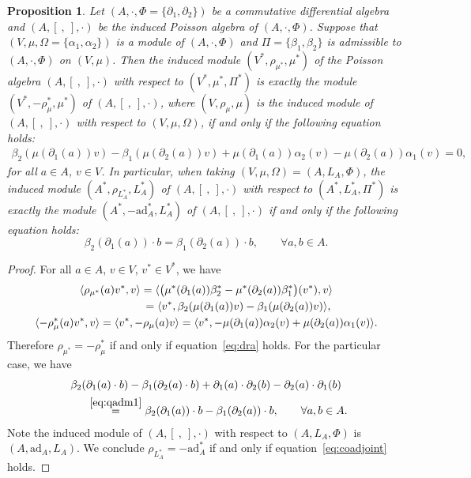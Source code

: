 \documentclass[pdftex]{sigma}
\numberwithin{equation}{section}
\newtheorem{Proposition}[Theorem]{Proposition}
{ \theoremstyle{definition}
	\newtheorem{Definition}[Theorem]{Definition}
	\newtheorem{Note}[Theorem]{Note}
	\newtheorem{Example}[Theorem]{Example}
	\newtheorem{Remark}[Theorem]{Remark} }
\newcommand{\ad}{\mathrm{ad}}
\begin{document}
\begin{Proposition}\label{pro:assdualrep}
 Let $(A, \cdot, \Phi = \{\partial_1, \partial_2\})$ be a commutative differential algebra and $(A, [\ ,\ ], \cdot)$ be the induced Poisson algebra of $(A, \cdot, \Phi)$.
 Suppose that $(V, \mu, \Omega = \{\alpha_1, \alpha_2\} )$ is a module of $(A, \cdot, \Phi)$ and
 $\Pi = \{\beta_1, \beta_2\}$ is admissible to $(A, \cdot, \Phi)$ on $(V, \mu)$.
 Then the induced module $(V^*, \rho_{\mu^*}, \mu^*)$ of the Poisson algebra $(A, [\ ,\ ], \cdot)$ with respect to $(V^*, \mu^*, \Pi^*)$ is exactly the module $(V^*, -\rho^*_\mu, \mu^*)$ of $(A, [\ ,\ ], \cdot)$,
 where $(V, \rho_\mu, \mu)$ is the induced module of $(A, [\ ,\ ], \cdot)$ with respect to $(V, \mu, \Omega)$,
 if and only if the following equation holds:
 \begin{gather}
 \beta_2(\mu(\partial_1(a))v) - \beta_1(\mu(\partial_2(a))v) + \mu(\partial_1(a))\alpha_2(v) - \mu(\partial_2(a))\alpha_1(v) = 0, \label{eq:dra}
 \end{gather}
for all $a \in A$, $v \in V$. In particular, when taking $(V, \mu, \Omega) = (A, L_A, \Phi)$,
 the induced module $(A^*, \rho_{L_A^*},\allowbreak L_A^*)$ of $(A, [\ ,\ ], \cdot)$ with respect to $(A^*, L_A^*, \Pi^*)$
 is exactly the module $(A^*, -\ad_A^*, L_A^*)$ of $(A, [\ ,\ ], \cdot)$
 if and only if the following equation holds:
 \begin{equation}
 \beta_2(\partial_1(a)) \cdot b = \beta_1(\partial_2(a)) \cdot b, \qquad \forall a, b \in A. \label{eq:coadjoint}
 \end{equation}
\end{Proposition}
\begin{proof}
 For all $a \in A$, $v \in V$, $v^* \in V^*$, we have
 \begin{gather*}
\langle \rho_{\mu^*}(a) v^*, v \rangle = \langle \big(\mu^*(\partial_1(a)) \beta_2^* - \mu^*(\partial_2(a)) \beta_1^*\big)(v^*), v \rangle \\
\hphantom{\langle \rho_{\mu^*}(a) v^*, v \rangle}{}
= \langle v^*, \beta_2(\mu(\partial_1(a))v) - \beta_1(\mu(\partial_2(a))v)\rangle, \\
\langle -\rho^*_{\mu}(a) v^*, v \rangle = \langle v^*, -\rho_{\mu}(a) v \rangle = \langle v^*, -\mu(\partial_1(a))\alpha_2(v) + \mu(\partial_2(a))\alpha_1(v) \rangle.
 \end{gather*}
 Therefore $\rho_{\mu^*} = -\rho^*_{\mu}$ if and only if equation~\eqref{eq:dra} holds.
 For the particular case, we have
 \begin{gather*}
 \beta_2(\partial_1(a) \cdot b) - \beta_1(\partial_2(a) \cdot b) + \partial_1(a) \cdot \partial_2(b) - \partial_2(a) \cdot \partial_1(b)\\
 \qquad{} \overset{\eqref{eq:qadm1}}{=} \beta_2(\partial_1(a)) \cdot b - \beta_1(\partial_2(a)) \cdot b, \qquad \forall a,b \in A.
 \end{gather*}
 Note the induced module of $(A, [\ ,\ ], \cdot)$ with respect to $(A, L_A, \Phi)$ is $(A, \ad_A, L_A)$.
 We conclude $\rho_{L_A^*} = -\ad_A^*$ if and only if equation~\eqref{eq:coadjoint} holds.
\end{proof}
\end{document}
